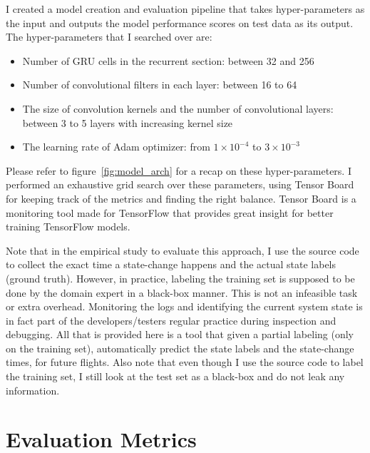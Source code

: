 I created a model creation and evaluation pipeline that takes hyper-parameters as the input and outputs the model performance scores on test data as its output. The hyper-parameters that I searched over are:
\begin{itemize}
    \item Number of GRU cells in the recurrent section: between 32 and 256
    \item Number of convolutional filters in each layer: between 16 to 64
    \item The size of convolution kernels and the number of convolutional layers: between 3 to 5 layers with increasing kernel size
    \item The learning rate of Adam optimizer: from $1\times 10^{-4}$ to $3\times10^{-3}$
\end{itemize}
Please refer to figure~\ref{fig:model_arch} for a recap on these hyper-parameters. 
I performed an exhaustive grid search over these parameters, using Tensor Board for keeping track of the metrics and finding the right balance.
Tensor Board is a monitoring tool made for TensorFlow \cite{tensorflow2015-whitepaper} that provides great insight for better training TensorFlow models.


Note that in the empirical study to evaluate this approach, I use the source code to collect the exact time a state-change happens and the actual state labels (ground truth). However, in practice, labeling the training set is supposed to be done by the domain expert in a black-box manner. This is not an infeasible task or extra overhead. Monitoring the logs and identifying the current system state is in fact part of the developers/testers regular practice during inspection and debugging. All that is provided here is a tool that given a partial labeling (only on the training set), automatically predict the state labels and the state-change times, for future flights. Also note that even though I use the source code to label the training set, I still look at the test set as a black-box and do not leak any information.

\section{Evaluation Metrics}
